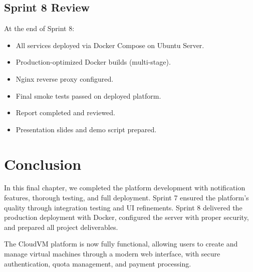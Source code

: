 \subsection{Sprint 8 Review}

At the end of Sprint 8:
\begin{itemize}
  \item All services deployed via Docker Compose on Ubuntu Server.
  \item Production-optimized Docker builds (multi-stage).
  \item Nginx reverse proxy configured.
  \item Final smoke tests passed on deployed platform.
  \item Report completed and reviewed.
  \item Presentation slides and demo script prepared.
\end{itemize}

\section{Conclusion}

In this final chapter, we completed the platform development with notification features, thorough testing, and full deployment. Sprint 7 ensured the platform's quality through integration testing and UI refinements. Sprint 8 delivered the production deployment with Docker, configured the server with proper security, and prepared all project deliverables.

The CloudVM platform is now fully functional, allowing users to create and manage virtual machines through a modern web interface, with secure authentication, quota management, and payment processing.


